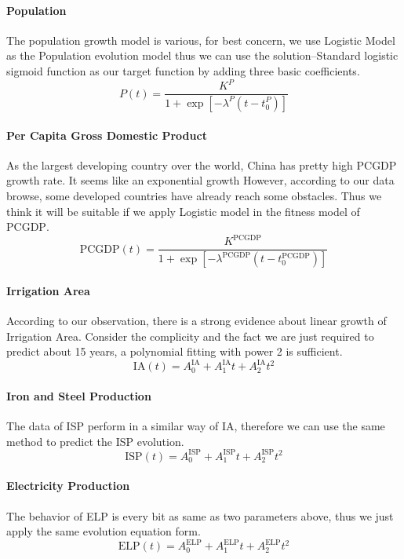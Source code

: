    \paragraph{Population}
      The population growth model is various, for best concern, we use Logistic Model as the Population evolution model thus we can use the solution--Standard logistic sigmoid function as our target function by adding three basic coefficients.
      $$
      P(t) = \frac{K^P}{1+\exp[-\lambda^P(t-t_0^P)]}
      $$

    \paragraph{Per Capita Gross Domestic Product}
      As the largest developing country over the world, China has pretty high PCGDP growth rate. It seems like an exponential growth However, according to our data browse, some developed countries have already reach some obstacles. Thus we think it will be suitable if we apply Logistic model in the fitness model of $\text{PCGDP}$.
      $$
      \text{PCGDP}(t) = \frac{K^\text{PCGDP}}{1+\exp[-\lambda^\text{PCGDP}(t-t_0^\text{PCGDP})]}
      $$

    \paragraph{Irrigation Area}
      According to our observation, there is a strong evidence about linear growth of Irrigation Area. Consider the complicity and the fact we are just required to predict about 15 years, a polynomial fitting with power 2 is sufficient.
    $$
    \text{IA}(t) = A_0^\text{IA}+A_1^\text{IA} t + A_2^\text{IA} t^2
    $$

    \paragraph{Iron and Steel Production}
      The data of ISP perform in a similar way of IA, therefore we can use the same method to predict the ISP evolution.
    $$
    \text{ISP}(t) = A_0^\text{ISP}+A_1^\text{ISP} t + A_2^\text{ISP} t^2
    $$

    \paragraph{Electricity Production}
      The behavior of ELP is every bit as same as two parameters above, thus we just apply the same evolution equation form.
    $$
    \text{ELP}(t) = A_0^\text{ELP}+A_1^\text{ELP} t + A_2^\text{ELP} t^2
    $$

